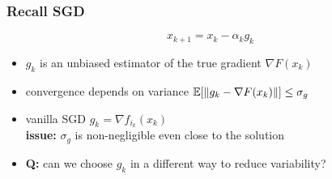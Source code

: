 \documentclass{beamer}
\begin{document}
\begin{frame}
  \frametitle{Recall SGD}
  \begin{equation}
    x_{k+1} = x_k - \alpha_k g_k
  \end{equation}
  \begin{itemize}
    \item $g_k$ is an unbiased estimator of the true gradient $\nabla F(x_k)$
    \item convergence depends on variance $\mathbb{E} [ \Vert g_k - \nabla F(x_k) \Vert ] \le \sigma_g$
    \item vanilla SGD $g_k = \nabla f_{i_k}(x_k)$ \\
          \textbf{issue:} $\sigma_g$ is non-negligible even close to the solution
    \item \textbf{Q:} can we choose $g_k$ in a different way to reduce variability?
  \end{itemize}

\end{frame}
\end{document}
